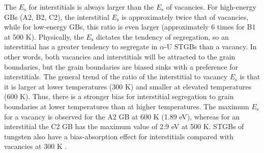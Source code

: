 \documentclass[review]{elsarticle}
\begin{document}
\par The $E_{\mathrm{s}}$ for interstitials is always larger than the $E_{\mathrm{s}}$ of vacancies. For high-energy GBs (A2, B2, C2), the interstitial $E_{\mathrm{s}}$ is approximately twice that of vacancies, while for low-energy GBs, this ratio is even larger (approximately 6 times for B1 at 500 K). Physically, the $E_{\mathrm{s}}$ dictates the tendency of segregation, so an interstitial has a greater tendency to segregate in $\alpha$-U STGBs than a vacancy. In other words, both vacancies and interstitials will be attracted to the grain boundaries, but the grain boundaries are biased sinks with a preference for interstitials.  The general trend of the ratio of the interstitial to vacancy $E_{\mathrm{s}}$ is that it is larger at lower temperatures (300 K) and smaller at elevated temperatures (600 K). Thus, there is a stronger bias for interstitial segregation to grain boundaries at lower temperatures than at higher temperatures. The maximum $E_{\mathrm{s}}$ for a vacancy is observed for the A2 GB at 600 K (1.89 eV), whereas for an interstitial the C2 GB has the maximum value of 2.9 eV at 500 K. STGBs of tungsten also have a bias-absorption effect for interstitials compared with vacancies at 300 K \cite{Tungsten}.  
\end{document}
